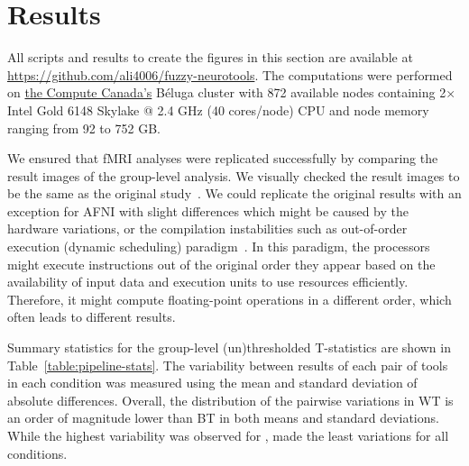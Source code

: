 \documentclass[conference]{IEEEtran}
\begin{document}
\section{Results}
All scripts and results to create the figures in this section are available at \url{https://github.com/ali4006/fuzzy-neurotools}.
The computations were performed on \href{https://www.computecanada.ca}{the Compute Canada's} Béluga cluster
with 872 available nodes containing 2× Intel Gold 6148 Skylake @ 2.4 GHz (40 cores/node) CPU and node memory ranging from 92 to 752 GB.

We ensured that fMRI analyses were replicated successfully by comparing the result images of the group-level analysis.
We visually checked the result images to be the same as the original study~\cite{bowring2019exploring}.
We could replicate the original results with an exception for AFNI with slight differences which might be caused by the hardware variations,
or the compilation instabilities such as out-of-order execution (dynamic scheduling) paradigm~\cite{duben2014use,demmel2013numerical}.
In this paradigm, the processors might execute instructions out of the original order they appear based on
the availability of input data and execution units to use resources efficiently. Therefore, it might
compute floating-point operations in a different order, which often leads to different results.

Summary statistics for the group-level (un)thresholded T-statistics are shown in Table~\ref{table:pipeline-stats}.
The variability between results of each pair of tools in each condition was measured using the mean and standard deviation of absolute differences.
Overall, the distribution of the pairwise variations in WT is an order of magnitude lower than BT in both means and standard deviations.
While the highest variability was observed for \fslafni, \fslspm made the least variations for all conditions.
\end{document}
